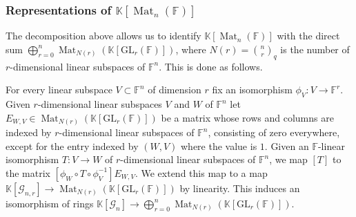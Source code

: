 \documentclass[12pt, reqno]{amsart}
\theoremstyle{definition}
\newcommand{\coefficientsField}{\mathbb{K}}
\newcommand{\GL}{\mathrm{GL}}
\newcommand{\finiteField}{\mathbb{F}}
\newcommand{\squareMatrix}{\operatorname{Mat}}
\begin{document}
	
	\subsubsection{Representations of $\coefficientsField\left[\squareMatrix_n\left(\finiteField\right)\right]$}\label{subsec:representations-of-m-n-f-q}
	The decomposition above allows us to identify $\coefficientsField\left[\squareMatrix_n\left(\finiteField\right)\right]$ with the direct sum $\bigoplus_{r=0}^{n} \squareMatrix_{N\left(r\right)}\left(\coefficientsField\left[\GL_r\left(\finiteField\right)\right]\right)$, where $N\left(r\right) = \binom{n}{r}_q$ is the number of $r$-dimensional linear subspaces of $\finiteField^n$. This is done as follows.
	
	For every linear subspace $V \subset \finiteField^n$ of dimension $r$ fix an isomorphism $\phi_{V} \colon V \to \finiteField^r$. Given $r$-dimensional linear subspaces $V$ and $W$ of $\finiteField^n$ let $E_{W,V} \in \squareMatrix_{N\left(r\right)}\left(\coefficientsField\left[\GL_r\left(\finiteField\right)\right]\right)$ be a matrix whose rows and columns are indexed by $r$-dimensional linear subspaces of $\finiteField^n$, consisting of zero everywhere, except for the entry indexed by $\left(W,V\right)$ where the value is $1$. Given an $\finiteField$-linear isomorphism $T \colon V \to W$ of $r$-dimensional linear subspaces of $\finiteField^n$, we map $\left[T\right]$ to the matrix $\left[\phi_{W} \circ T \circ \phi_{V}^{-1}\right] E_{W,V}$. We extend this map to a map $\coefficientsField\left[\mathcal{G}_{n,r}\right] \to \squareMatrix_{N\left(r\right)}\left(\coefficientsField\left[\GL_r\left(\finiteField\right)\right]\right)$ by linearity. This induces an isomorphism of rings $\coefficientsField\left[\mathcal{G}_{n}\right] \to \bigoplus_{r=0}^{n} \squareMatrix_{N\left(r\right)}\left(\coefficientsField\left[\GL_r\left(\finiteField\right)\right]\right)$. 
	
\end{document}
